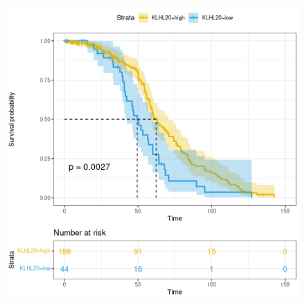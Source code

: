 \documentclass[fleqn,10pt]{SelfArx} %
\begin{document}
\begin{figure}[ht]
\begin{multicols}{2}
		 			\includegraphics[width=0.7\linewidth]{figures/KLHL20.png}

					\columnbreak


\end{multicols}
\end{figure}
\end{document}

